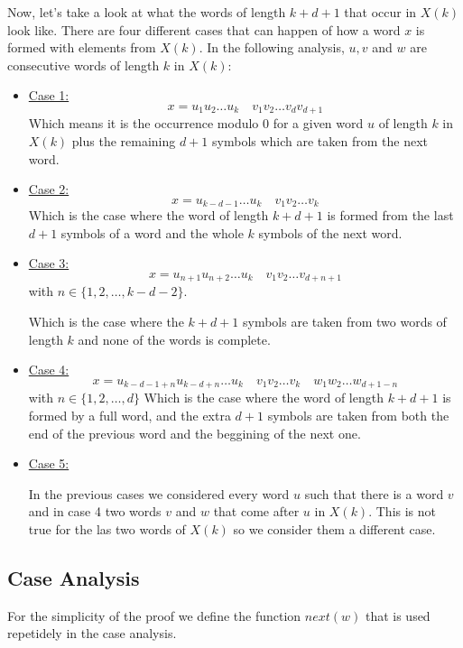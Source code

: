 \documentclass[11pt,a4paper]{tesis}
\theoremstyle{definition}
\begin{document}
Now, let's take a look at what the words of length $k + d + 1$ that occur in $X(k)$ look like. There are four different cases that can happen of how a word $x$ is formed with elements from $X(k)$. 
In the following analysis, $u, v$ and $w$ are consecutive words of length $k$ in $X(k)$:

\begin{itemize}
  \item \underline{Case 1:} 
  $$x = u_1 u_2 \dots u_k \quad v_1 v_2 \dots v_{d} v_{d + 1}$$
    Which means it is the occurrence modulo 0 for a given word $u$ of length $k$ in $X(k)$ plus the remaining $d + 1$ symbols which are taken from the next word.

  \item \underline{Case 2:} 
  $$ x = u_{k-d-1} \dots u_k \quad v_1 v_2 \dots v_k$$
  Which is the case where the word of length $k + d + 1$ is formed from the last $d + 1$ symbols of a word and the whole $k$ symbols of the next word.

  \item \underline{Case 3:} 
  $$x = u_{n+1} u_{n+2} \dots u_k \quad  v_1 v_2 \dots v_{d+n+1} $$
with $n \in \{1,2,\dots ,k - d - 2\}$.

   Which is the case where the $k + d + 1$ symbols are taken from two words of length $k$ and none of the words is complete.

  
  \item \underline{Case 4:} 
  $$ x = u_{k-d-1+n} u_{k-d+n} \dots u_k \quad v_1 v_2 \dots v_k \quad w_1 w_2 \dots w_{d+1-n}$$
  with $n \in \{1, 2, \dots , d\}$
  Which is the case where the word of length $k + d + 1$ is formed by a full word, and the extra $d + 1$ symbols are taken from both the end of the previous word and the beggining of the next one.

  \item \underline{Case 5:} 
  
   In the previous cases we considered every word $u$ such that there is a word $v$ and in case 4 two words $v$ and $w$ that come after $u$ in $X(k)$. This is not true for the las two words of $X(k)$ so we consider them a different case.
  

\end{itemize}



\subsection{Case Analysis}
For the simplicity of the proof we define the function $next(w)$ that is used repetidely in the case analysis.
\end{document}
